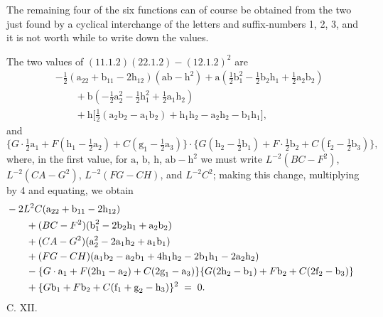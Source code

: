 \documentclass[11pt,a4paper]{article}
\begin{document}
The remaining four of the six functions can of course be obtained from the two just found by a cyclical interchange of the letters and suffix-numbers 1, 2, 3, and it is not worth while to write down the values.

\medskip
The two values of $(11.1.2)(22.1.2) - (12.1.2)^{2}$ are
\begin{align*}
&-\tfrac{1}{2}(\text{a}_{22} + \text{b}_{11} - 2\text{h}_{12})(\text{a}\text{b} - \text{h}^{2}) + \text{a}(\tfrac{1}{2}\text{b}_{1}^{2} - \tfrac{1}{2}\text{b}_{2}\text{h}_{1} + \tfrac{1}{2}\text{a}_{2}\text{b}_{2})\\
&\qquad + \text{b}(-\tfrac{1}{2}\text{a}_{2}^{2} - \tfrac{1}{2}\text{h}_{1}^{2} + \tfrac{1}{2}\text{a}_{1}\text{h}_{2})\\
&\qquad + \text{h}\big[\tfrac{1}{2}(\text{a}_{2}\text{b}_{2} - \text{a}_{1}\text{b}_{2}) + \text{h}_{1}\text{h}_{2} - \text{a}_{2}\text{h}_{2} - \text{b}_{1}\text{h}_{1}\big],
\end{align*}
and
\[
\{G\cdot \tfrac{1}{2}\text{a}_{1} + F(\text{h}_{1} - \tfrac{1}{2}\text{a}_{2}) + C(\text{g}_{1} - \tfrac{1}{2}\text{a}_{3})\}\cdot \{G(\text{h}_{2} - \tfrac{1}{2}\text{b}_{1}) + F\cdot \tfrac{1}{2}\text{b}_{2} + C(\text{f}_{2} - \tfrac{1}{2}\text{b}_{3})\},
\]
where, in the first value, for $\text{a}$, $\text{b}$, $\text{h}$, $\text{ab} - \text{h}^{2}$ we must write $L^{-2}(BC - F^{2})$, $L^{-2}(CA - G^{2})$, $L^{-2}(FG - CH)$, and $L^{-2}C^{2}$; making this change, multiplying by 4 and equating, we obtain
\begin{align*}
&\hspace*{-1em} -2L^{2}C(\text{a}_{22} + \text{b}_{11} - 2\text{h}_{12})\\
&\quad + (BC - F^{2})(\text{b}_{1}^{2} - 2\text{b}_{2}\text{h}_{1} + \text{a}_{2}\text{b}_{2})\\
&\quad + (CA - G^{2})(\text{a}_{2}^{2} - 2\text{a}_{1}\text{h}_{2} + \text{a}_{1}\text{b}_{1})\\
&\quad + (FG - CH)(\text{a}_{1}\text{b}_{2} - \text{a}_{2}\text{b}_{1} + 4\text{h}_{1}\text{h}_{2} - 2\text{b}_{1}\text{h}_{1} - 2\text{a}_{2}\text{h}_{2})\\
&\quad - \{G\cdot \text{a}_{1} + F(2\text{h}_{1} - \text{a}_{2}) + C(2\text{g}_{1} - \text{a}_{3})\}\{G(2\text{h}_{2} - \text{b}_{1}) + F\text{b}_{2} + C(2\text{f}_{2} - \text{b}_{3})\}\\
&\quad + \{G\text{b}_{1} + F\text{b}_{2} + C(\text{f}_{1} + \text{g}_{2} - \text{h}_{3})\}^{2}\;=\;0.
\end{align*}
\hfill C. XII.
\clearpage
\end{document}
